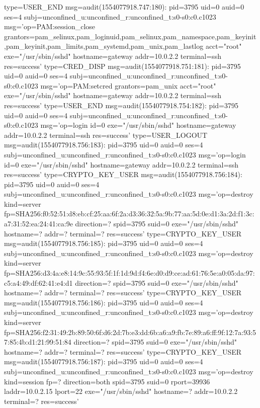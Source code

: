 \documentclass[]{report}
\newenvironment{Shaded}{}{}
\newcommand{\NormalTok}[1]{#1}
\begin{document}
\begin{Shaded}
\begin{Highlighting}[]
\NormalTok{type=USER_END msg=audit(1554077918.747:180): pid=3795 uid=0 auid=0 ses=4 subj=unconfined_u:unconfined_r:unconfined_t:s0-s0:c0.c1023 msg='op=PAM:session_close grantors=pam_selinux,pam_loginuid,pam_selinux,pam_namespace,pam_keyinit,pam_keyinit,pam_limits,pam_systemd,pam_unix,pam_lastlog acct="root" exe="/usr/sbin/sshd" hostname=gateway addr=10.0.2.2 terminal=ssh res=success'}
\NormalTok{type=CRED_DISP msg=audit(1554077918.751:181): pid=3795 uid=0 auid=0 ses=4 subj=unconfined_u:unconfined_r:unconfined_t:s0-s0:c0.c1023 msg='op=PAM:setcred grantors=pam_unix acct="root" exe="/usr/sbin/sshd" hostname=gateway addr=10.0.2.2 terminal=ssh res=success'}
\NormalTok{type=USER_END msg=audit(1554077918.754:182): pid=3795 uid=0 auid=0 ses=4 subj=unconfined_u:unconfined_r:unconfined_t:s0-s0:c0.c1023 msg='op=login id=0 exe="/usr/sbin/sshd" hostname=gateway addr=10.0.2.2 terminal=ssh res=success'}
\NormalTok{type=USER_LOGOUT msg=audit(1554077918.756:183): pid=3795 uid=0 auid=0 ses=4 subj=unconfined_u:unconfined_r:unconfined_t:s0-s0:c0.c1023 msg='op=login id=0 exe="/usr/sbin/sshd" hostname=gateway addr=10.0.2.2 terminal=ssh res=success'}
\NormalTok{type=CRYPTO_KEY_USER msg=audit(1554077918.756:184): pid=3795 uid=0 auid=0 ses=4 subj=unconfined_u:unconfined_r:unconfined_t:s0-s0:c0.c1023 msg='op=destroy kind=server fp=SHA256:f0:52:51:d8:eb:cf:25:aa:6f:2a:d3:36:32:5a:9b:77:aa:5d:0e:d1:3a:2d:f1:3c:a7:31:52:ea:24:41:ca:9e direction=? spid=3795 suid=0  exe="/usr/sbin/sshd" hostname=? addr=? terminal=? res=success'}
\NormalTok{type=CRYPTO_KEY_USER msg=audit(1554077918.756:185): pid=3795 uid=0 auid=0 ses=4 subj=unconfined_u:unconfined_r:unconfined_t:s0-s0:c0.c1023 msg='op=destroy kind=server fp=SHA256:d3:4a:e8:14:9c:55:93:5f:1f:1d:9d:f4:6e:d0:d9:ce:ad:61:76:5e:a0:05:da:97:c5:a4:49:df:62:41:e4:d1 direction=? spid=3795 suid=0  exe="/usr/sbin/sshd" hostname=? addr=? terminal=? res=success'}
\NormalTok{type=CRYPTO_KEY_USER msg=audit(1554077918.756:186): pid=3795 uid=0 auid=0 ses=4 subj=unconfined_u:unconfined_r:unconfined_t:s0-s0:c0.c1023 msg='op=destroy kind=server fp=SHA256:f2:31:49:2b:89:50:6f:d6:2d:7b:e3:dd:6b:a6:a9:fb:7e:89:a6:ff:9f:12:7a:93:57:85:4b:d1:21:99:51:84 direction=? spid=3795 suid=0  exe="/usr/sbin/sshd" hostname=? addr=? terminal=? res=success'}
\NormalTok{type=CRYPTO_KEY_USER msg=audit(1554077918.756:187): pid=3795 uid=0 auid=0 ses=4 subj=unconfined_u:unconfined_r:unconfined_t:s0-s0:c0.c1023 msg='op=destroy kind=session fp=? direction=both spid=3795 suid=0 rport=39936 laddr=10.0.2.15 lport=22  exe="/usr/sbin/sshd" hostname=? addr=10.0.2.2 terminal=? res=success'}

\end{Highlighting}
\end{Shaded}
\end{document}
